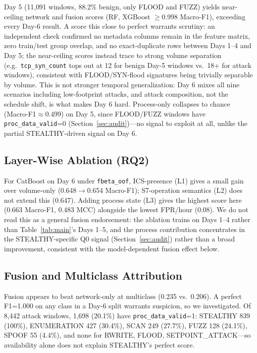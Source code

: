 \documentclass[conference]{IEEEtran}
\newcommand{\fbetaoof}{\texttt{fbeta\_oof}}
\begin{document}
Day 5 (11{,}091 windows, 88.2\% benign, only FLOOD and FUZZ) yields near-ceiling network and fusion scores
(RF, XGBoost $\geq$0.998 Macro-F1), exceeding every Day-6 result. A score this close to perfect warrants
scrutiny: an independent check confirmed no metadata columns remain in the feature matrix, zero
train/test group overlap, and no exact-duplicate rows between Days 1--4 and Day 5; the near-ceiling scores
instead trace to strong volume separation (e.g.\ \texttt{tcp\_syn\_count} tops out at 12 for benign
Day-5 windows vs.\ 18+ for attack windows), consistent with FLOOD/SYN-flood signatures being trivially
separable by volume. This is not stronger temporal generalization: Day 6 mixes all nine scenarios
including low-footprint attacks, and attack composition, not the schedule shift, is what makes Day 6
hard. Process-only collapses to chance (Macro-F1$\approx$0.499) on Day 5, since FLOOD/FUZZ windows have
\texttt{proc\_data\_valid}=0 (Section~\ref{sec:audit})---no signal to exploit at all, unlike the partial
STEALTHY-driven signal on Day 6.

\subsection{Layer-Wise Ablation (RQ2)}

For CatBoost on Day 6 under \fbetaoof, ICS-presence (L1) gives a small gain over volume-only
(0.648$\rightarrow$0.654 Macro-F1); S7-operation semantics (L2) does not extend this (0.647). Adding
process state (L3) gives the highest score here (0.663 Macro-F1, 0.483 MCC) alongside the lowest FPR/hour
(0.08). We do not read this as a general fusion endorsement: the ablation trains on Days 1--4 rather than
Table~\ref{tab:main}'s Days 1--5, and the process contribution concentrates in the STEALTHY-specific Q0
signal (Section~\ref{sec:audit}) rather than a broad improvement, consistent with the model-dependent
fusion effect below.

\subsection{Fusion and Multiclass Attribution}

Fusion appears to beat network-only at multiclass (0.235 vs.\ 0.206). A perfect F1=1.000 on any class in
a Day-6 split warrants suspicion, so we investigated. Of 8{,}442 attack windows, 1{,}698 (20.1\%) have
\texttt{proc\_data\_valid}=1: STEALTHY 839 (100\%), ENUMERATION 427 (30.4\%), SCAN 249 (27.7\%), FUZZ 128
(24.1\%), SPOOF 55 (4.4\%), and none for RWRITE, FLOOD, SETPOINT\_ATTACK---so availability alone does not
explain STEALTHY's perfect score.
\end{document}
